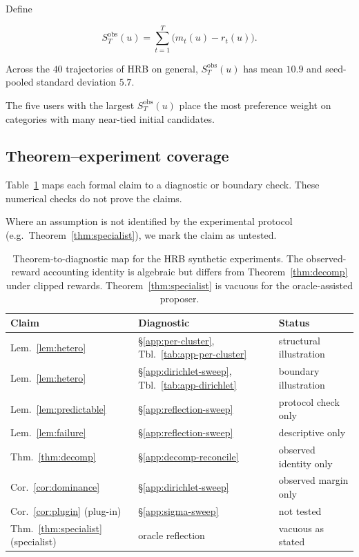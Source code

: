\documentclass{article} %
\begin{document}
Define

\begin{equation}
\label{eq:app-per-user-residual}
S_T^{\mathrm{obs}}(u)
=
\sum_{t=1}^{T}\big(m_t(u)-r_t(u)\big).
\end{equation}

Across the \(40\) trajectories of HRB on general,
\(S_T^{\mathrm{obs}}(u)\) has mean \(10.9\) and seed-pooled standard deviation
\(5.7\).

The five users with the largest \(S_T^{\mathrm{obs}}(u)\) place the most
preference weight on categories with many near-tied initial candidates.

\subsection{Theorem--experiment coverage}

\label{app:coverage-map}

Table~\ref{tab:app-coverage-sweeps} maps each formal claim to a diagnostic or
boundary check. These numerical checks do not prove the claims.

Where an assumption is not identified by the experimental protocol (e.g.\ Theorem~\ref{thm:specialist}), we mark the claim as untested.

\begin{table}[h]
\centering
\small
\caption{Theorem-to-diagnostic map for the HRB synthetic experiments. The observed-reward accounting identity is
algebraic but differs from Theorem~\ref{thm:decomp} under clipped rewards.
Theorem~\ref{thm:specialist} is vacuous for the oracle-assisted proposer.}
\label{tab:app-coverage-sweeps}
\begin{tabular}{lll}
\toprule
Claim & Diagnostic & Status \\
\midrule
Lem.~\ref{lem:hetero} & \S\ref{app:per-cluster}, Tbl.~\ref{tab:app-per-cluster} & structural illustration \\
Lem.~\ref{lem:hetero} & \S\ref{app:dirichlet-sweep}, Tbl.~\ref{tab:app-dirichlet} & boundary illustration \\
Lem.~\ref{lem:predictable} & \S\ref{app:reflection-sweep} & protocol check only \\
Lem.~\ref{lem:failure} & \S\ref{app:reflection-sweep} & descriptive only \\
Thm.~\ref{thm:decomp} & \S\ref{app:decomp-reconcile} & observed identity only \\
Cor.~\ref{cor:dominance} & \S\ref{app:dirichlet-sweep} & observed margin only \\
Cor.~\ref{cor:plugin} (plug-in) & \S\ref{app:sigma-sweep} & not tested \\
Thm.~\ref{thm:specialist} (specialist) & oracle reflection & vacuous as stated \\
\bottomrule
\end{tabular}

\end{table}
\end{document}
